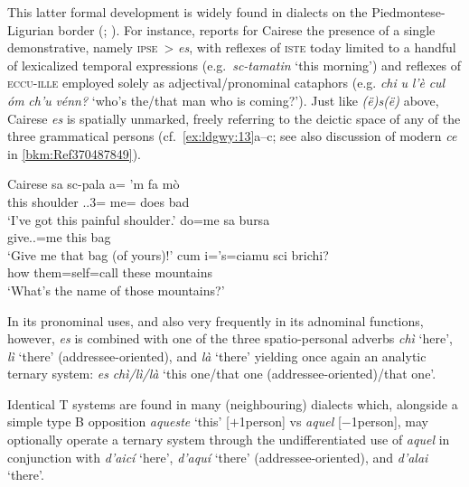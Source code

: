 \documentclass[output=paper]{langsci/langscibook}
\begin{document}
This latter formal development is widely found in dialects on the
Piedmontese-Ligurian border (\citealt[251]{Forner:1997a};
\citealt[98f]{Irsara:2009a}). For instance,
\textcites{Parry:1991a}[150--153]{Parry:2005a} reports for Cairese the presence
of a single demonstrative, namely \textsc{ipse}~> \emph{es}, with reflexes of
\textsc{iste} today limited to a handful of lexicalized temporal expressions
(e.g.\ \emph{sc-tamatin} ‘this morning’) and reflexes of \textsc{eccu-ille}
employed solely as adjectival/pronominal cataphors (e.g. \emph{chi} \emph{u}
\emph{l’è} \emph{cul} \emph{óm} \emph{ch’u} \emph{vénn?} ‘who’s the/that man
who is coming?’). Just like \emph{(ë)s(ë)} above, Cairese \emph{es} is
spatially unmarked, freely referring to the deictic space of any of the three
grammatical persons (cf.\ \ref{ex:ldgwy:13}a--c; see also discussion of
modern  \emph{ce} in \cref{bkm:Ref370487849}).

\ea\label{bkm:Ref370498976}\label{ex:ldgwy:13}Cairese \citep{Parry:1991a,Parry:2005a}
    \ea
    \gll  sa  sc-pala a= ’m  fa  mò\\
             this  shoulder  \Sbj{}.\Cl{}.3=  me=  does  bad\\
    \glt \enquote*{I’ve got this painful shoulder.}
    \ex
    \gll  do=me  sa  bursa\\
             give.\Imp{}.\Ssg{}=me  this  bag\\
    \glt \enquote*{Give me that bag (of yours)!}
    \ex
    \gll  cum  i=’s=ciamu  sci  brichi?\\
             how  them=self=call  these  mountains\\
    \glt \enquote*{What’s the name of those mountains?}
    \z
\z

In its pronominal uses, and also very frequently in its adnominal functions,
however, \emph{es} is combined with one of the three spatio-personal adverbs
\emph{chì} ‘here’, \emph{lì} ‘there’ (addressee-oriented), and \emph{là}
‘there’ yielding once again an analytic ternary system: \emph{es}
\emph{chì/lì/là} ‘this one/that one (addressee-oriented)/that one’.

Identical T systems are found in many (neighbouring)  dialects
\citep[21]{CollegidOccitania} which, alongside a simple type B
opposition \emph{aqueste} ‘this’ [$+$1person] vs \emph{aquel}
[$-$1person], may optionally operate a ternary system through the
undifferentiated use of \emph{aquel} in conjunction with \emph{d’aicí} ‘here’,
\emph{d’aquí} ‘there’ (addressee-oriented), and \emph{d’alai} ‘there’.
\end{document}
